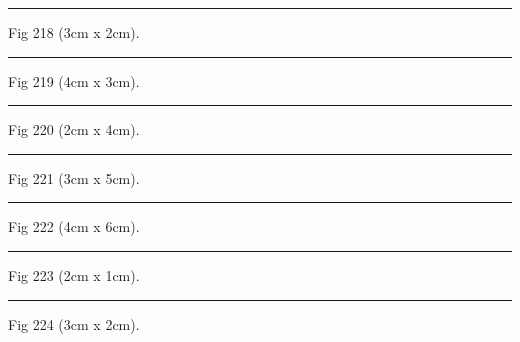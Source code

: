 \documentclass[a4paper,11pt]{article}
\begin{document}
\begin{swarmwrap}%
  \begin{minipage}[t]{3cm}
    \centering
    \rule{\linewidth}{2cm}
    {\footnotesize Fig 218 (3cm x 2cm).}
  \end{minipage}%
\end{swarmwrap}%
\swarmwrapnext
\lipsum[68]%

\begin{swarmwrap}%
  \begin{minipage}[t]{4cm}
    \centering
    \rule{\linewidth}{3cm}
    {\footnotesize Fig 219 (4cm x 3cm).}
  \end{minipage}%
\end{swarmwrap}%
\swarmwrapnext
\lipsum[69]%

\begin{swarmwrap}%
  \begin{minipage}[t]{2cm}
    \centering
    \rule{\linewidth}{4cm}
    {\footnotesize Fig 220 (2cm x 4cm).}
  \end{minipage}%
\end{swarmwrap}%
\swarmwrapnext
\lipsum[70]%

\begin{swarmwrap}%
  \begin{minipage}[t]{3cm}
    \centering
    \rule{\linewidth}{5cm}
    {\footnotesize Fig 221 (3cm x 5cm).}
  \end{minipage}%
\end{swarmwrap}%
\swarmwrapnext
\lipsum[71]%

\begin{swarmwrap}%
  \begin{minipage}[t]{4cm}
    \centering
    \rule{\linewidth}{6cm}
    {\footnotesize Fig 222 (4cm x 6cm).}
  \end{minipage}%
\end{swarmwrap}%
\swarmwrapnext
\lipsum[72]%

\begin{swarmwrap}%
  \begin{minipage}[t]{2cm}
    \centering
    \rule{\linewidth}{1cm}
    {\footnotesize Fig 223 (2cm x 1cm).}
  \end{minipage}%
\end{swarmwrap}%
\swarmwrapnext
\lipsum[73]%

\begin{swarmwrap}%
  \begin{minipage}[t]{3cm}
    \centering
    \rule{\linewidth}{2cm}
    {\footnotesize Fig 224 (3cm x 2cm).}
  \end{minipage}%
\end{swarmwrap}%
\swarmwrapnext
\lipsum[74]%
\end{document}
